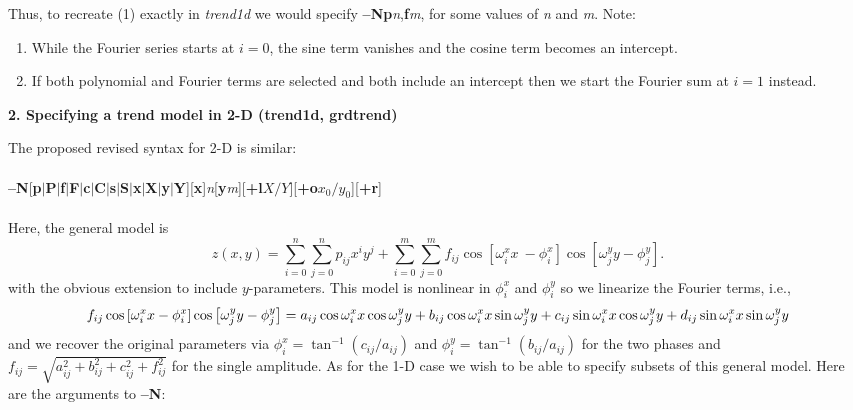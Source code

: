 \documentclass[12pt,letterpaper,margin=0.5in]{report}
\begin{document}
Thus, to recreate (1) exactly in {\it trend1d} we would specify {\bf --Np}{\it n},{\bf f}{\it m}, for some values of {\it n} and {\it m}.  Note:
\begin{enumerate}
	\item While the Fourier series starts at $i = 0$, the sine term vanishes and the cosine term becomes an intercept.
	\item If both polynomial and Fourier terms are selected and both include an intercept then we start the Fourier sum at $i = 1$ instead.
\end{enumerate}

\par
\noindent
{\bf 2. Specifying a trend model in 2-D (trend1d, grdtrend)}


\noindent
The proposed revised syntax for 2-D is similar:
\\ \\
{\bf --N}[{\bf p}$|${\bf P}$|${\bf f}$|${\bf F}$|${\bf c}$|${\bf C}$|${\bf s}$|${\bf S}$|${\bf x}$|${\bf X}$|${\bf y}$|${\bf Y}][{\bf x}]{\it n}[{\bf y}{\it m}][{\bf +l}$X/Y$][{\bf +o}$x_0/y_0$][{\bf +r}]
\\ \\
Here, the general model is
\begin{equation}
z(x,y) = \sum_{i = 0}^n \sum_{j = 0}^n p_{ij} x^iy^j + \sum_{i = 0}^m \sum_{j = 0}^m f_{ij} \cos \left [\omega_i^x x \
	- \phi_i^x \right ] \cos \left [\omega_j^y y - \phi_j^y \right ] .
\end{equation}
with the obvious extension to include $y$-parameters.
This model is nonlinear in $\phi_i^x$ and $\phi_i^y$ so we linearize the Fourier terms, i.e.,
\begin{dmath}
f_{ij} \cos \left [\omega_i^x x- \phi_i^x \right ] \cos \left [\omega_j^y y - \phi_j^y \right ] =
a_{ij} \cos \omega_i^x x \cos \omega_j^y y + b_{ij} \cos \omega_i^x x \sin \omega_j^y y + \\
c_{ij} \sin \omega_i^x x \cos \omega_j^y y + d_{ij} \sin \omega_i^x x \sin \omega_j^y y
\end{dmath}
and we recover the original parameters via $\phi_i^x = \tan^{-1}(c_{ij}/a_{ij})$ and $\phi_i^y = \tan^{-1}(b_{ij}/a_{ij})$
for the two phases and $f_{ij} = \sqrt{a_{ij}^2 + b_{ij}^2 + c_{ij}^2 + f_{ij}^2}$ for the single amplitude.
As for the 1-D case
we wish to be able to specify subsets of this general model.  Here are the arguments to {\bf --N}:
\end{document}
